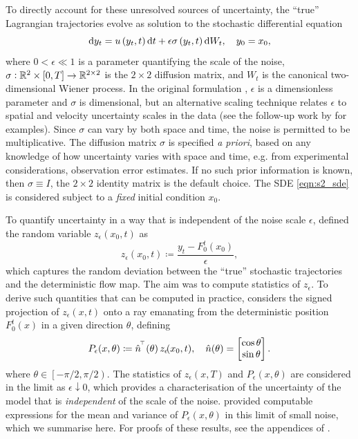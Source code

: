To directly account for these unresolved sources of uncertainty, the ``true'' Lagrangian trajectories evolve as solution to the stochastic differential equation
\begin{equation}
	\sde{y_t}{u\left(y_t, t\right)}{\epsilon\sigma\left(y_t, t\right)}, \quad y_0 = x_0
	\label{eqn:s2_sde},
\end{equation}
where \(0 < \epsilon \ll 1\) is a parameter quantifying the scale of the noise, \(\sigma:	\mathbb{R}^2\times[0,T] \to \mathbb{R}^{2\times 2}\) is the \(2\times 2\) diffusion matrix, and \(W_t\) is the canonical two-dimensional Wiener process.
In the original formulation \citep{Balasuriya_2020_StochasticSensitivityComputable}, \(\epsilon\) is a dimensionless parameter and \(\sigma\) is dimensional, but an alternative scaling technique relates \(\epsilon\) to spatial and velocity uncertainty scales in the data (see the follow-up work by \citet{BadzaEtAl_2023_HowSensitiveAre,Balasuriya_2020_UncertaintyFinitetimeLyapunov,FangEtAl_2020_DisentanglingResolutionPrecision} for examples).
Since \(\sigma\) can vary by both space and time, the noise is permitted to be multiplicative.
The diffusion matrix \(\sigma\) is specified \emph{a priori}, based on any knowledge of how uncertainty varies with space and time, e.g. from experimental considerations, observation error estimates.
If no such prior information is known, then \(\sigma \equiv I\), the \(2 \times 2\) identity matrix is the default choice.
The SDE \cref{eqn:s2_sde} is considered subject to a \emph{fixed} initial condition \(x_0\).

To quantify uncertainty in a way that is independent of the noise scale \(\epsilon\), \citet{Balasuriya_2020_StochasticSensitivityComputable} defined the random variable \(z_\epsilon\left(x_0,t\right)\) as
\[
	z_\epsilon\!\left(x_0,t\right) \coloneqq \frac{y_t - F_0^t(x_0)}{\epsilon},
\]
which captures the random deviation between the ``true'' stochastic trajectories and the deterministic flow map.
The aim was to compute statistics of \(z_\epsilon\).
To derive such quantities that can be computed in practice, \citet{Balasuriya_2020_StochasticSensitivityComputable} considers the signed projection of \(z_\epsilon\!\left(x,t\right)\) onto a ray emanating from the deterministic position \(F_0^t(x)\) in a given direction \(\theta\), defining
\[
	P_\epsilon\!\left(x,\theta\right) \coloneqq \hat{n}^{^{\!\top}}\!\left(\theta\right) z_\epsilon\!(x_0,t), \quad \hat{n}\!\left(\theta\right) = \begin{bmatrix}
		\cos{\theta} \\
		\sin{\theta}
	\end{bmatrix}.
\]
where \(\theta \in \left[-\pi/2, \pi/2\right)\).
The statistics of \(z_\epsilon\left(x,T\right)\) and \(P_\epsilon(x,\theta)\) are considered in the limit as \(\epsilon\downarrow 0\), which provides a characterisation of the uncertainty of the model that is \emph{independent} of the scale of the noise.
\citet{Balasuriya_2020_StochasticSensitivityComputable} provided computable expressions for the mean and variance of \(P_\epsilon\left(x,\theta\right)\) in this limit of small noise, which we summarise here.
For proofs of these results, see the appendices of \citet{Balasuriya_2020_StochasticSensitivityComputable}.

